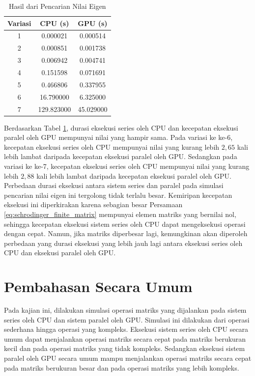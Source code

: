 \begin{table}[H]
	\centering
	\caption{Hasil dari Pencarian Nilai Eigen}
	\label{tab:result_eigenvalue_schrodinger}
	\begin{tabular}{ccc}
		\toprule
		Variasi & CPU (s)    & GPU (s)   \\
		\midrule
		1       & 0.000021   & 0.000514  \\
		2       & 0.000851   & 0.001738  \\
		3       & 0.006942   & 0.004741  \\
		4       & 0.151598   & 0.071691  \\
		5       & 0.466806   & 0.337955  \\
		6       & 16.790000  & 6.325000  \\
		7       & 129.823000 & 45.029000 \\
		\bottomrule
	\end{tabular}
\end{table}

Berdasarkan Tabel \ref{tab:result_eigenvalue_schrodinger}, durasi eksekusi series oleh CPU dan kecepatan eksekusi paralel oleh GPU mempunyai nilai yang hampir sama. Pada variasi ke ke-6, kecepatan eksekusi series oleh CPU mempunyai nilai yang kurang lebih $2,65$ kali lebih lambat daripada kecepatan eksekusi paralel oleh GPU. Sedangkan pada variasi ke ke-7, kecepatan eksekusi series oleh CPU mempunyai nilai yang kurang lebih $2,88$ kali lebih lambat daripada kecepatan eksekusi paralel oleh GPU. Perbedaan durasi eksekusi antara sistem series dan paralel pada simulasi pencarian nilai eigen ini tergolong tidak terlalu besar. Kemiripan kecepatan eksekusi ini diperkirakan karena sebagian besar Persamaan \ref{eq:schrodinger_finite_matrix} mempunyai elemen matriks yang bernilai nol, sehingga kecepatan eksekusi sistem series oleh CPU dapat mengeksekusi operasi dengan cepat. Namun, jika matriks diperbesar lagi, kemungkinan akan diperoleh perbedaan yang durasi eksekusi yang lebih jauh lagi antara eksekusi series oleh CPU dan eksekusi paralel oleh GPU.

\section{Pembahasan Secara Umum}

Pada kajian ini, dilakukan simulasi operasi matriks yang dijalankan pada sistem series oleh CPU dan sistem paralel oleh GPU. Simulasi ini dilakukan dari operasi sederhana hingga operasi yang kompleks. Eksekusi sistem series oleh CPU secara umum dapat menjalankan operasi matriks secara cepat pada matriks berukuran kecil dan pada operasi matriks yang tidak kompleks. Sedangkan eksekusi sistem paralel oleh GPU secara umum mampu menjalankan operasi matriks secara cepat pada matriks berukuran besar dan pada operasi matriks yang lebih kompleks.

